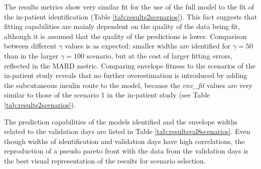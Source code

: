 The results metrics show very similar fit for the use of the full model to the fit of the in-patient identification (Table \ref{tab:results2scenarios}). This fact suggests that fitting capabilities are mainly dependent on the quality of the data being fit, although it is assumed that the quality of the predictions is lower. Comparison between different $\gamma$ values is as expected: smaller widths are identified for $\gamma =50$ than in the larger $\gamma =100$ scenario, but at the cost of larger fitting errors, reflected in the MARD metric. Comparing envelope fitness to the scenarios of the in-patient study reveals that no further overestimation is introduced by adding the subcutaneous insulin route to the model, because the \textit{env\_fit} values are very similar to those of the scenario 1 in the in-patient study (see Table \ref{tab:results2scenarios}). 

The prediction capabilities of the models identified and the envelope widths related to the validation days are listed in Table \ref{tab:resultsval8scenarios}. Even though widths of identification and validation days have high correlations, the reproduction of a pseudo pareto front with the data from the validation days is the best visual representation of the results for scenario selection.

